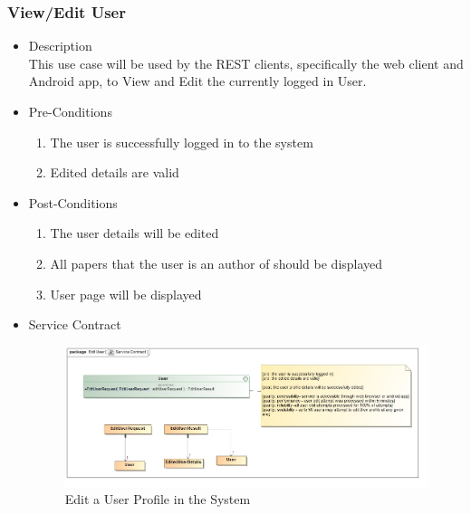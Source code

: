 \documentclass[a4paper,10pt]{article}
\begin{document}
\subsubsection{View/Edit User}
	\begin{itemize}
		\item Description\\
			This use case will be used by the REST clients, specifically the web client and Android app, to View and Edit the currently logged in User.
		\item Pre-Conditions
			\begin{enumerate}
				\item The user is successfully logged in to the system
				\item Edited details are valid
			\end{enumerate}
		\item Post-Conditions
			\begin{enumerate}
				\item The user details will be edited
				\item All papers that the user is an author of should be displayed 
				\item User page will be displayed
						
			\end{enumerate}
		\item Service Contract
				\begin{figure}[H]
				\includegraphics[scale=0.5]{Edit_User}
				\caption{Edit a User Profile in the System}	
				\end{figure}
	\end{itemize}
\end{document}
